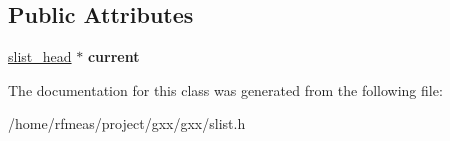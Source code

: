 \subsection*{Public Attributes}
\begin{DoxyCompactItemize}
\item 
\hyperlink{structslist__head}{slist\+\_\+head} $\ast$ {\bfseries current}\hypertarget{classgxx_1_1slist_1_1const__iterator_a46b8690bd78c2e94eb7577386269216b}{}\label{classgxx_1_1slist_1_1const__iterator_a46b8690bd78c2e94eb7577386269216b}

\end{DoxyCompactItemize}


The documentation for this class was generated from the following file\+:\begin{DoxyCompactItemize}
\item 
/home/rfmeas/project/gxx/gxx/slist.\+h\end{DoxyCompactItemize}

